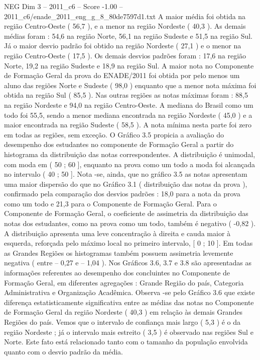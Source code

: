 \begin{textsample}{NEG Dim 3 – 2011\_c6 – Score -1.00 – 2011\_c6/enade\_2011\_eng\_g\_8\_80de7597d1.txt}
A maior média foi obtida na região Centro-Oeste ( 56,7 ), e a menor na região Nordeste ( 40,3 ).
As demais médias foram : 54,6 na região Norte, 56,1 na região Sudeste e 51,5 na região Sul.
Já o maior desvio padrão foi obtido na região Nordeste ( 27,1 ) e o menor na região Centro-Oeste ( 17,5 ).
Os demais desvios padrões foram : 17,6 na região Norte, 19,2 na região Sudeste e 18,9 na região Sul.
A maior nota no Componente de Formação Geral da prova do ENADE/2011 foi obtida por pelo menos um aluno das regiões Norte e Sudeste ( 98,0 ) enquanto que a menor nota máxima foi obtida na região Sul ( 85,5 ).
Nas outras regiões as notas máximas foram : 88,5 na região Nordeste e 94,0 na região Centro-Oeste.
A mediana do Brasil como um todo foi 55,5, sendo a menor mediana encontrada na região Nordeste ( 45,0 ) e a maior encontrada na região Sudeste ( 58,5 ).
A nota mínima nesta parte foi zero em todas as regiões, sem exceção.
O Gráfico 3.5 propicia a avaliação do desempenho dos estudantes no componente de Formação Geral a partir do histograma da distribuição das notas correspondentes.
A distribuição é unimodal, com moda em ( 50 ; 60 ], enquanto na prova como um todo a moda foi alcançada no intervalo ( 40 ; 50 ].
Nota -se, ainda, que no gráfico 3.5 as notas apresentam uma maior dispersão do que no Gráfico 3.1 ( distribuição das notas da prova ), confirmado pela comparação dos desvios padrões : 18,0 para a nota da prova como um todo e 21,3 para o Componente de Formação Geral.
Para o Componente de Formação Geral, o coeficiente de assimetria da distribuição das notas dos estudantes, como na prova como um todo, também é negativo ( -0,82 ).
A distribuição apresenta uma leve concentração à direita e cauda maior à esquerda, reforçada pelo máximo local no primeiro intervalo, [ 0 ; 10 ].
Em todas as Grandes Regiões os histogramas também possuem assimetria levemente negativa ( entre – 0,27 e – 1,04 ).
Nos Gráficos 3.6, 3.7 e 3.8 são apresentadas as informações referentes ao desempenho dos concluintes no Componente de Formação Geral, em diferentes agregações : Grande Região do país, Categoria Administrativa e Organização Acadêmica.
Observa -se pelo Gráfico 3.6 que existe diferença estatisticamente significativa entre as médias das notas no Componente de Formação Geral da região Nordeste ( 40,3 ) em relação às demais Grandes Regiões do país.
Vemos que o intervalo de confiança mais largo ( 5,3 ) é o da região Nordeste ; já o intervalo mais estreito ( 3,5 ) é observado nas regiões Sul e Norte.
Este fato está relacionado tanto com o tamanho da população envolvida quanto com o desvio padrão da média.

\end{textsample}
